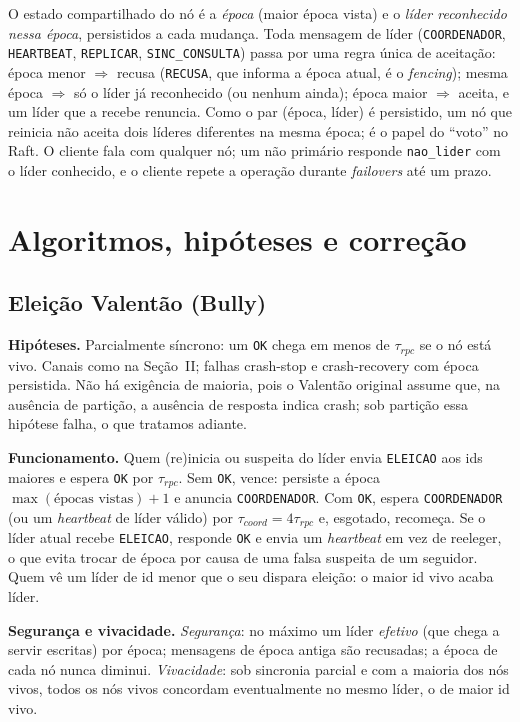 \documentclass[conference,a4paper]{IEEEtran}
\begin{document}
O estado compartilhado do nó é a \emph{época} (maior época vista) e o
\emph{líder reconhecido nessa época}, persistidos a cada mudança. Toda
mensagem de líder (\texttt{COORDENADOR}, \texttt{HEARTBEAT},
\texttt{REPLICAR}, \texttt{SINC\_CONSULTA}) passa por uma regra única de
aceitação: época menor $\Rightarrow$ recusa (\texttt{RECUSA}, que informa a
época atual, é o \emph{fencing}); mesma época $\Rightarrow$ só o líder já
reconhecido (ou nenhum ainda); época maior $\Rightarrow$ aceita, e um líder
que a recebe renuncia. Como o par (época, líder) é persistido, um nó que
reinicia não aceita dois líderes diferentes na mesma época; é o papel do
``voto'' no Raft. O cliente fala com qualquer nó; um não primário responde
\texttt{nao\_lider} com o líder conhecido, e o cliente repete a operação
durante \emph{failovers} até um prazo.

\section{Algoritmos, hipóteses e correção}

\subsection{Eleição Valentão (Bully)}

\textbf{Hipóteses.} Parcialmente síncrono: um \texttt{OK} chega em menos de
$\tau_{rpc}$ se o nó está vivo. Canais como na Seção~II; falhas crash-stop e
crash-recovery com época persistida. Não há exigência de maioria, pois o
Valentão original assume que, na ausência de partição, a ausência de
resposta indica crash; sob partição essa hipótese falha, o que tratamos
adiante.

\textbf{Funcionamento.} Quem (re)inicia ou suspeita do líder envia
\texttt{ELEICAO} aos ids maiores e espera \texttt{OK} por $\tau_{rpc}$. Sem
\texttt{OK}, vence: persiste a época $\max(\text{épocas vistas})+1$ e anuncia
\texttt{COORDENADOR}. Com \texttt{OK}, espera \texttt{COORDENADOR} (ou um
\emph{heartbeat} de líder válido) por $\tau_{coord}=4\tau_{rpc}$ e,
esgotado, recomeça. Se o líder atual recebe \texttt{ELEICAO}, responde
\texttt{OK} e envia um \emph{heartbeat} em vez de reeleger, o que evita
trocar de época por causa de uma falsa suspeita de um seguidor. Quem vê um
líder de id menor que o seu dispara eleição: o maior id vivo acaba líder.

\textbf{Segurança e vivacidade.} \emph{Segurança}: no máximo um líder
\emph{efetivo} (que chega a servir escritas) por época; mensagens de época
antiga são recusadas; a época de cada nó nunca diminui. \emph{Vivacidade}:
sob sincronia parcial e com a maioria dos nós vivos, todos os nós vivos
concordam eventualmente no mesmo líder, o de maior id vivo.
\end{document}
